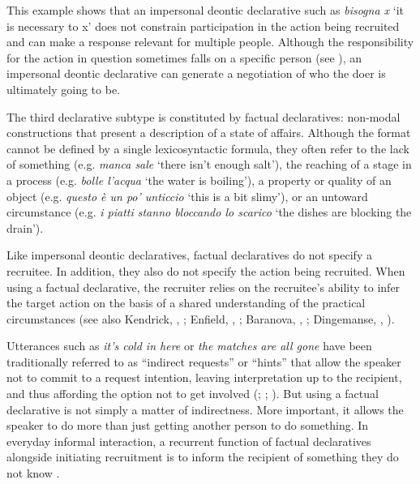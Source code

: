 \documentclass[output=paper,modfonts]{langscibook}
\begin{document}
This example shows that an impersonal deontic declarative such as \textit{bisogna x} ‘it is necessary to x’ does not constrain participation in the action being recruited and can make a response relevant for multiple people. Although the responsibility for the action in question sometimes falls on a specific person (see \citealt{RossiZinken2016}), an impersonal deontic declarative can generate a negotiation of who the doer is ultimately going to be.

The third declarative subtype is constituted by factual declaratives: non-modal constructions that present a description of a state of affairs. Although the format cannot be defined by a single lexicosyntactic formula, they often refer to the lack of something (e.g. \textit{manca sale} ‘there isn't enough salt’), the reaching of a stage in a process (e.g. \textit{bolle l'acqua} ‘the water is boiling’), a property or quality of an object (e.g. \textit{questo è un po’ unticcio} ‘this is a bit slimy’), or an untoward circumstance (e.g. \textit{i piatti stanno bloccando lo scarico} ‘the dishes are blocking the drain’). 

Like impersonal deontic declaratives, factual declaratives do not specify a recruitee. In addition, they also do not specify the action being recruited. When using a factual declarative, the recruiter relies on the recruitee's ability to infer the target action on the basis of a shared understanding of the practical circumstances (see also Kendrick, , ; Enfield, , ; Baranova, , ; Dingemanse, , ). 

Utterances such as \textit{it's cold in here} or \textit{the matches are all gone} have been traditionally referred to as “indirect requests” or “hints” that allow the speaker not to commit to a request intention, leaving interpretation up to the recipient, and thus affording the option not to get involved (\citealt[42]{ErvinTripp1976}; \citealt[69, 216]{BrownLevinson1987}; \citealt{Weizman1989}). But using a factual declarative is not simply a matter of indirectness. More important, it allows the speaker to do more than just getting another person to do something. In everyday informal interaction, a recurrent function of factual declaratives alongside initiating recruitment is to inform the recipient of something they do not know \citep{Rossi2018}.
\end{document}
